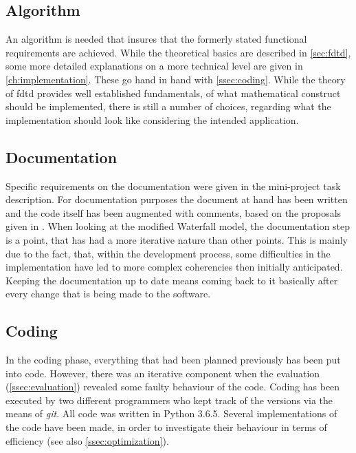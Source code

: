 \subsection{Algorithm}\label{ssec:algorithm}
An algorithm is needed that insures that the formerly stated functional requirements are achieved. While the theoretical basics are described in \autoref{sec:fdtd}, some more detailed explanations on a more technical level are given in \autoref{ch:implementation}. These go hand in hand with \autoref{ssec:coding}. While the theory of \gls{fdtd} provides well established fundamentals, of what mathematical construct should be implemented, there is still a number of choices, regarding what the implementation should look like considering the intended application. 
\subsection{Documentation}\label{ssec:documentation}
Specific requirements on the documentation were given in the mini-project task description. For documentation purposes the document at hand has been written and the code itself has been augmented with comments, based on the proposals given in \citep{pep8}.
When looking at the modified Waterfall model, the documentation step is a point, that has had a more iterative nature than other points. This is mainly due to the fact, that, within the development process, some difficulties in the implementation have led to more complex coherencies then initially anticipated. Keeping the documentation up to date means coming back to it basically after every change that is being made to the software.
\subsection{Coding}\label{ssec:coding}
In the coding phase, everything that had been planned previously has been put into code. However, there was an iterative component when the evaluation (\autoref{ssec:evaluation}) revealed some faulty behaviour of the code. Coding has been executed by two different programmers who kept track of the versions via the means of \textit{git}. All code was written in Python 3.6.5. Several implementations of the code have been made, in order to investigate their behaviour in terms of efficiency (see also \autoref{ssec:optimization}).
